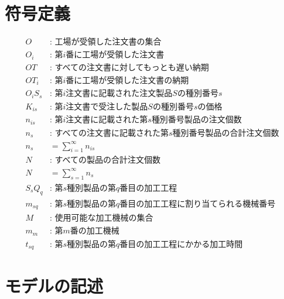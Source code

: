 \documentclass[twocolumn]{jarticle}
\begin{document}
\section{符号定義}
\begin{align}
    O &\text{: 工場が受領した注文書の集合} \nonumber\\
    O_{i} &\text{: 第$i$番に工場が受領した注文書} \nonumber\\
    OT &\text{: すべての注文書に対してもっとも遅い納期} \nonumber\\
    OT_{i} &\text{: 第$i$番に工場が受領した注文書の納期} \nonumber\\
    O_{i}S_{s} &\text{: 第$i$注文書に記載された注文製品$S$の種別番号$s$} \nonumber\\
    K_{is} &\text{: 第$i$注文書で受注した製品$S$の種別番号$s$の価格} \nonumber\\
    n_{is} &\text{: 第$i$注文書に記載された第$s$種別番号製品の注文個数} \nonumber\\
    n_{s} &\text{: すべての注文書に記載された第$s$種別番号製品の合計注文個数} \nonumber\\
    n_{s} &= \sum_{i=1}^{\infty} n_{is} \nonumber\\
    N &\text{: すべての製品の合計注文個数} \nonumber\\
    N &= \sum_{s=1}^{\infty} n_{s} \nonumber\\
    S_{s}Q_{q} &\text{: 第$s$種別製品の第$q$番目の加工工程} \nonumber\\
    m_{sq} &\text{: 第$s$種別製品の第$q$番目の加工工程に割り当てられる機械番号} \nonumber\\
    M &\text{: 使用可能な加工機械の集合} \nonumber\\
    m_{m} &\text{: 第$m$番の加工機械} \nonumber\\
    t_{sq} &\text{: 第$s$種別製品の第$q$番目の加工工程にかかる加工時間} \nonumber
\end{align}

\section{モデルの記述}
\end{document}
